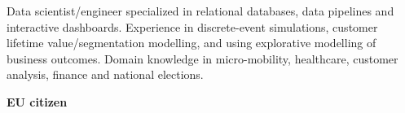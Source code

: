 

\begin{cvparagraph}
\begin{minipage}[t]{0.3\textwidth} %
Data scientist/engineer specialized in relational databases, data pipelines and
interactive dashboards. Experience in discrete-event simulations, customer
lifetime value/segmentation modelling, and using explorative modelling of business outcomes.
Domain knowledge in micro-mobility, healthcare, customer analysis, finance and national elections.

\medskip
\textbf{EU citizen}

\end{minipage}
\hfill
\begin{minipage}[t]{0.6\textwidth} %

\end{minipage}
\end{cvparagraph}
